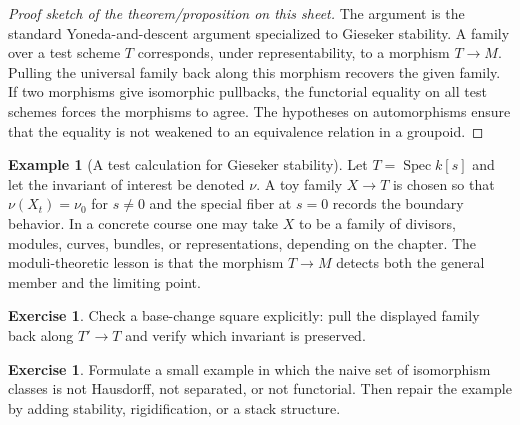 \documentclass[11pt]{amsart}
\theoremstyle{definition}
\newtheorem{example}[theorem]{Example}
\newtheorem{exercise}[theorem]{Exercise}
\newcommand{\Spec}{\operatorname{Spec}}
\begin{document}
\begin{proof}[Proof sketch of the theorem/proposition on this sheet]
The argument is the standard Yoneda-and-descent argument specialized to Gieseker stability.  A family over a test scheme $T$ corresponds, under representability, to a morphism $T\to M$.  Pulling the universal family back along this morphism recovers the given family.  If two morphisms give isomorphic pullbacks, the functorial equality on all test schemes forces the morphisms to agree.  The hypotheses on automorphisms ensure that the equality is not weakened to an equivalence relation in a groupoid.
\end{proof}
\begin{example}[A test calculation for Gieseker stability]
Let $T=\Spec k[s]$ and let the invariant of interest be denoted $\nu$.  A toy family $X\to T$ is chosen so that $\nu(X_t)=\nu_0$ for $s\ne0$ and the special fiber at $s=0$ records the boundary behavior.  In a concrete course one may take $X$ to be a family of divisors, modules, curves, bundles, or representations, depending on the chapter.  The moduli-theoretic lesson is that the morphism $T\to M$ detects both the general member and the limiting point.
\end{example}
\begin{exercise}
Check a base-change square explicitly: pull the displayed family back along $T\prime\to T$ and verify which invariant is preserved.
\end{exercise}
\begin{exercise}
Formulate a small example in which the naive set of isomorphism classes is not Hausdorff, not separated, or not functorial.  Then repair the example by adding stability, rigidification, or a stack structure.
\end{exercise}
\clearpage
\end{document}
